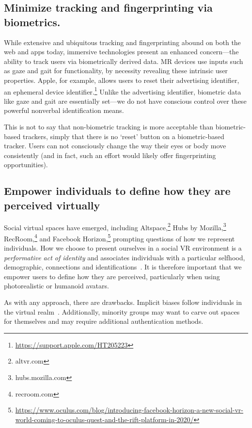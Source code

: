 \subsection{Minimize tracking and fingerprinting via biometrics.}
While extensive and ubiquitous tracking and fingerprinting abound on both the web and apps today, immersive technologies present an enhanced concern---the ability to track users via biometrically derived data. MR devices use inputs such as gaze and gait for functionality, by necessity revealing these intrinsic user properties. Apple, for example, allows users to reset their advertising identifier, an ephemeral device identifier.\footnote{\url{https://support.apple.com/HT205223}} Unlike the advertising identifier, biometric data like gaze and gait are essentially set---we do not have conscious control over these powerful nonverbal identification means.	

This is not to say that non-biometric tracking is more acceptable than biometric-based trackers, simply that there is no `reset' button on a biometric-based tracker. Users can not consciously change the way their eyes or body move consistently (and in fact, such an effort would likely offer fingerprinting opportunities).

\subsection{Empower individuals to define how they are perceived virtually}
Social virtual spaces have emerged, including Altspace,\footnote{altvr.com} Hubs by Mozilla,\footnote{hubs.mozilla.com} RecRoom,\footnote{recroom.com} and Facebook Horizon,\footnote{\url{https://www.oculus.com/blog/introducing-facebook-horizon-a-new-social-vr-world-coming-to-oculus-quest-and-the-rift-platform-in-2020/}}
 prompting questions of how we represent individuals. How we choose to present ourselves in a social VR environment is a \emph{performative act of identity} and associates individuals with a particular selfhood, demographic, connections and identifications~\cite{cover2012performing}. It is therefore important that we empower users to define how they are perceived, particularly when using photorealistic or humanoid avatars.

As with any approach, there are drawbacks. Implicit biases follow individuals in the virtual realm~\cite{maloney}. Additionally, minority groups may want to carve out spaces for themselves and may require additional authentication methods.


